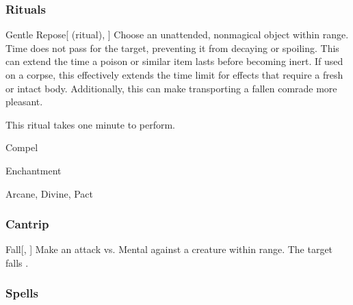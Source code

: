 \subsubsection{Rituals}


\lowercase{\hypertarget{spell:Gentle Repose}{}}\label{spell:Gentle Repose}
\begin{attuneability}[\nth{2}]{\hypertarget{spell:Gentle Repose}{Gentle Repose}}[ (ritual), ]
Choose an unattended, nonmagical object within \rngclose range.
Time does not pass for the target, preventing it from decaying or spoiling.
This can extend the time a poison or similar item lasts before becoming inert.
If used on a corpse, this effectively extends the time limit for effects that require a fresh or intact body.
Additionally, this can make transporting a fallen comrade more pleasant.


This ritual takes one minute to perform.
\end{attuneability}
\vspace{0.25em}


\newpage
\begin{spellsection}{Compel}

\begin{spellheader}
\end{spellheader}


 Enchantment

 Arcane, Divine, Pact

\subsubsection{Cantrip}


\begin{freeability}{Fall}[, ]
Make an attack vs. Mental against a creature within \rngmed range.
\hit The target falls .
\end{freeability}

\end{spellsection}


\subsubsection{Spells}



